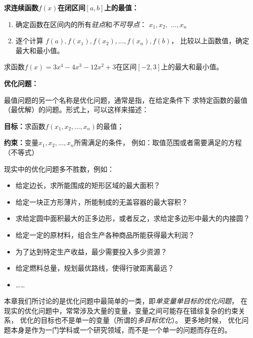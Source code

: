 \begin{center}
\end{center}

\begin{thx}
	{\bf 求连续函数$f(x)$在闭区间$[a,b]$上的最值：}
	\begin{enumerate}[(1)]
	  \item 确定函数在区间内的所有{\it 驻点}和{\it 不可导点}：
	  $x_1,x_2,$ $\ldots,x_n$ 
	  \item 逐个计算
	  $f(a),f(x_1),f(x_2),\ldots,f(x_n),f(b)$，
	  比较以上函数值，确定最大和最小值。
	\end{enumerate}
\end{thx}

\egz 求函数$f(x)=3x^4-4x^3-12x^2+3$在区间$[-2,3]$上的最大和最小值。

\begin{shaded}
	{\bf 优化问题：}
	
	最值问题的另一个名称是优化问题，通常是指，在给定条件下
	求特定函数的最值（最优解）的问题。形式上，可以这样来描述：
	
	\begin{tcolorbox}
		{\bf 目标：}求函数$f(x_1,x_2,\ldots,x_n)$的最值；
	
		{\bf 约束：}变量$x_1,x_2,\ldots,x_n$所需满足的条件，
		例如：取值范围或者需要满足的方程（不等式）
	\end{tcolorbox}
	现实中的优化问题多不胜数，例如：	
	\begin{itemize}
	  \item 给定边长，求所能围成的矩形区域的最大面积？
	  \item 给定一块正方形薄片，所能制成的无盖容器的最大容积？
	  \item 求给定圆中面积最大的正多边形，或者反之，求给定多边形中最大的内接圆？
	  \item 给定一定的原材料，组合生产各种商品所能获得最大利润？
	  \item 为了达到特定生产收益，最少需要投入多少资源？
	  \item 给定燃料总量，规划最优路线，使得行驶距离最远？
	  \item \ldots \ldots
	\end{itemize}
	
	本章我们所讨论的是优化问题中最简单的一类，即{\it 单变量单目标的优化问题}，
	在现实的优化问题中，常常涉及大量的变量，变量之间可能存在错综复杂的约束关系，
	优化的目标也不是单一的变量（所谓的{\it 多目标优化}）。	更多地时候，
	优化问题本身是作为一门学科或一个研究领域，而不是一个单一的问题而存在的。
\end{shaded}

